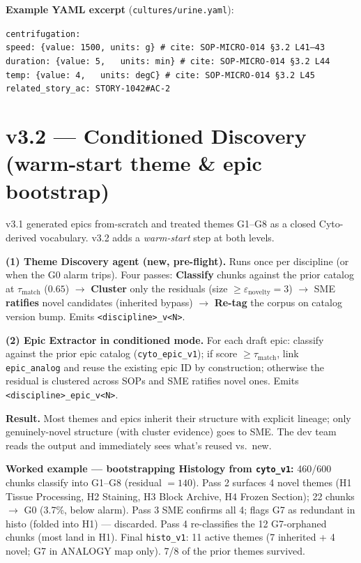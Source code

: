 \documentclass[10.5pt,letterpaper]{article}
\begin{document}
\textbf{Example YAML excerpt} (\texttt{cultures/urine.yaml}):

\noindent\texttt{\small centrifugation:\\
\hspace*{1em}speed:    \{value: 1500, units: g\}    \# cite: SOP-MICRO-014 \S 3.2 L41--43\\
\hspace*{1em}duration: \{value: 5,\ \ \ units: min\}  \# cite: SOP-MICRO-014 \S 3.2 L44\\
\hspace*{1em}temp:     \{value: 4,\ \ \ units: degC\} \# cite: SOP-MICRO-014 \S 3.2 L45\\
related\_story\_ac: STORY-1042\#AC-2}

\section{v3.2 --- Conditioned Discovery (warm-start theme \& epic bootstrap)}

v3.1 generated epics from-scratch and treated themes G1--G8 as a closed Cyto-derived vocabulary. v3.2 adds a \emph{warm-start} step at both levels.

\textbf{(1) Theme Discovery agent (new, pre-flight).} Runs once per discipline (or when the G0 alarm trips). Four passes: \textbf{Classify} chunks against the prior catalog at $\tau_{\text{match}}$ ($0.65$) $\rightarrow$ \textbf{Cluster} only the residuals (size $\geq \varepsilon_{\text{novelty}}=3$) $\rightarrow$ SME \textbf{ratifies} novel candidates (inherited bypass) $\rightarrow$ \textbf{Re-tag} the corpus on catalog version bump. Emits \texttt{<discipline>\_v<N>}.

\textbf{(2) Epic Extractor in conditioned mode.} For each draft epic: classify against the prior epic catalog (\texttt{cyto\_epic\_v1}); if score $\geq \tau_{\text{match}}$, link \texttt{epic\_analog} and reuse the existing epic ID by construction; otherwise the residual is clustered across SOPs and SME ratifies novel ones. Emits \texttt{<discipline>\_epic\_v<N>}.

\textbf{Result.} Most themes and epics inherit their structure with explicit lineage; only genuinely-novel structure (with cluster evidence) goes to SME. The dev team reads the output and immediately sees what's reused vs.\ new.

\textbf{Worked example --- bootstrapping Histology from \texttt{cyto\_v1}:} 460/600 chunks classify into G1--G8 (residual $= 140$). Pass 2 surfaces 4 novel themes (H1 Tissue Processing, H2 Staining, H3 Block Archive, H4 Frozen Section); 22 chunks $\rightarrow$ G0 (3.7\%, below alarm). Pass 3 SME confirms all 4; flags G7 as redundant in histo (folded into H1) --- discarded. Pass 4 re-classifies the 12 G7-orphaned chunks (most land in H1). Final \texttt{histo\_v1}: 11 active themes (7 inherited + 4 novel; G7 in ANALOGY map only). 7/8 of the prior themes survived.
\end{document}
